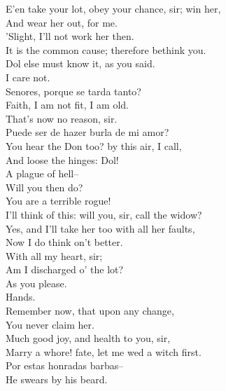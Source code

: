 \documentclass{memoir}
\begin{document}
\begin{drama*}
 E'en take your lot, obey your chance, sir; win her,\\
 And wear her out, for me.\\
\subtlespeaks {} 'Slight, I'll not work her then.\\
\facespeaks  It is the common cause; therefore bethink you.\\
 Dol else must know it, as you said.\\
\subtlespeaks {} I care not.\\
\surlyspeaks  Senores, porque se tarda tanto?\\
\subtlespeaks  Faith, I am not fit, I am old.\\
\facespeaks {} That's now no reason, sir.\\
\surlyspeaks  Puede ser de hazer burla de mi amor?\\
\facespeaks  You hear the Don too? by this air, I call,\\
 And loose the hinges: Dol!\\
\subtlespeaks {} A plague of hell--\\
\facespeaks  Will you then do?\\
\subtlespeaks {} You are a terrible rogue!\\
 I'll think of this: will you, sir, call the widow?\\
\facespeaks  Yes, and I'll take her too with all her faults,\\
 Now I do think on't better.\\
\subtlespeaks {} With all my heart, sir;\\
 Am I discharged o' the lot?\\
\facespeaks {} As you please.\\
\subtlespeaks  Hands.\\
\facespeaks {} Remember now, that upon any change,\\
 You never claim her.\\
\subtlespeaks {} Much good joy, and health to you, sir,\\
 Marry a whore! fate, let me wed a witch first.\\
\surlyspeaks  Por estas honradas barbas--\\
\subtlespeaks {} He swears by his beard.\\

\end{drama*}
\end{document}
